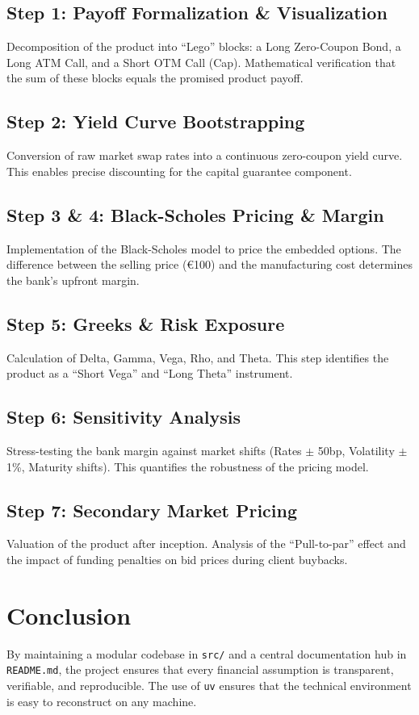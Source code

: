 \documentclass[11pt,a4paper]{article}
\begin{document}
\subsection{Step 1: Payoff Formalization \& Visualization}
Decomposition of the product into ``Lego'' blocks: a Long Zero-Coupon Bond, a Long ATM Call, and a Short OTM Call (Cap). Mathematical verification that the sum of these blocks equals the promised product payoff.

\subsection{Step 2: Yield Curve Bootstrapping}
Conversion of raw market swap rates into a continuous zero-coupon yield curve. This enables precise discounting for the capital guarantee component.

\subsection{Step 3 \& 4: Black-Scholes Pricing \& Margin}
Implementation of the Black-Scholes model to price the embedded options. The difference between the selling price (€100) and the manufacturing cost determines the bank's upfront margin.

\subsection{Step 5: Greeks \& Risk Exposure}
Calculation of Delta, Gamma, Vega, Rho, and Theta. This step identifies the product as a ``Short Vega'' and ``Long Theta'' instrument.

\subsection{Step 6: Sensitivity Analysis}
Stress-testing the bank margin against market shifts (Rates $\pm$ 50bp, Volatility $\pm$ 1\%, Maturity shifts). This quantifies the robustness of the pricing model.

\subsection{Step 7: Secondary Market Pricing}
Valuation of the product after inception. Analysis of the ``Pull-to-par'' effect and the impact of funding penalties on bid prices during client buybacks.

\section{Conclusion}
By maintaining a modular codebase in \texttt{src/} and a central documentation hub in \texttt{README.md}, the project ensures that every financial assumption is transparent, verifiable, and reproducible. The use of \texttt{uv} ensures that the technical environment is easy to reconstruct on any machine.
\end{document}
